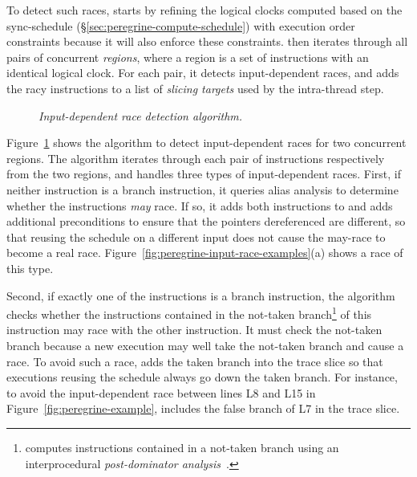 To detect such races, \peregrine starts by refining the logical clocks computed
based on the sync-schedule (\S\ref{sec:peregrine-compute-schedule}) with
execution order constraints because it will also enforce these
constraints.  \peregrine then iterates through all pairs
of concurrent \emph{regions}, where a region is a set of instructions with an identical
logical clock.  For each pair, it detects input-dependent races, and adds
the racy instructions to a list of \emph{slicing targets} used by the
intra-thread step.

\begin{figure}[!ht]
\vspace{-.3in}
\begin{minipage}[t]{\textwidth}
\tiny  {}
\end{minipage}
\vspace{-.2in}
\caption{{\em Input-dependent race detection
    algorithm.}} \label{fig:peregrine-detect-input-race}
\vspace{-.1in}
\end{figure}

Figure~\ref{fig:peregrine-detect-input-race} shows the algorithm to detect
input-dependent races for two concurrent regions.  The algorithm iterates
through each pair of instructions respectively from the
two regions, and handles three types of input-dependent races.  First, if
neither instruction is a branch instruction, it queries alias analysis to
determine whether the instructions \emph{may} race.  If so, it adds both
instructions to  and adds additional
preconditions to ensure that the pointers dereferenced are different, so
that reusing the schedule on a different input does not cause the may-race
to become a real race.  Figure~\ref{fig:peregrine-input-race-examples}(a) shows
a race of this type.

Second, if exactly one of the instructions is a branch instruction, the
algorithm checks whether the instructions contained in the not-taken
branch\footnote{\peregrine computes instructions contained in a not-taken
  branch using an interprocedural \emph{post-dominator
    analysis}~\cite{aho:dragon:06}.} of this instruction may race with the
other instruction.
It must check the not-taken branch because a new
execution may well take the not-taken branch and cause a race.  To avoid such a
race, \peregrine adds the taken branch into the trace slice so that executions
reusing the schedule always go down the taken branch.  For instance, to
avoid the input-dependent race between lines L8 and L15
in Figure~\ref{fig:peregrine-example}, \peregrine includes
the false branch of L7 in the trace slice.

